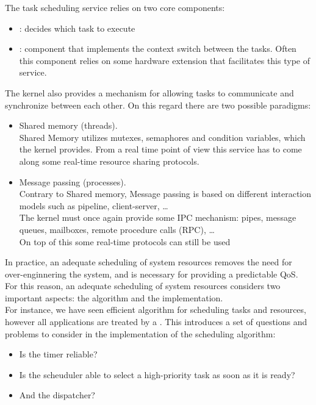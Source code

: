 The task scheduling service relies on two core components:
\begin{itemize}
    \item {}: decides which task to execute
    \item {}: component that implements the context switch between the tasks. Often this component relies on some hardware extension that facilitates this type of service.
\end{itemize}

The kernel also provides a mechanism for allowing tasks to communicate and synchronize between each other. On this regard there are two possible paradigms: 
\begin{itemize}
    \item Shared memory (threads).\\
    Shared Memory utilizes mutexes, semaphores and condition variables, which the kernel provides. From a real time point of view this service has to come along some real-time resource sharing protocols.
    \item Message passing (processes).\\
    Contrary to Shared memory, Message passing is based on different interaction models such as pipeline, client-server, \dots\\
    The kernel must once again provide some IPC mechanism: pipes, message queues, mailboxes, remote procedure calls (RPC), \dots\\
    On top of this some real-time protocols can still be used
\end{itemize}

In practice, an adequate scheduling of system resources removes the need for over-enginnering the system, and is necessary for providing a predictable QoS. For this reason, an adequate scheduling of system resources considers two important aspects: the algorithm and the implementation.\\
For instance, we have seen efficient algorithm for scheduling tasks and resources, however all applications are treated by a . 
This introduces a set of questions and problems to consider in the implementation of the scheduling algorithm:
\begin{itemize}
    \item Is the timer reliable?
    \item Is the scheuduler able to select a high-priority task as soon as it is ready?
    \item And the dispatcher?
\end{itemize}

